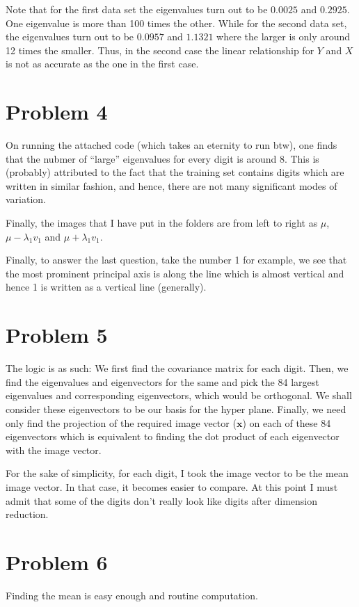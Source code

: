 \documentclass[12pt]{article}
\begin{document}
	Note that for the first data set the eigenvalues turn out to be $0.0025$ and $0.2925$. One eigenvalue is more than 100 times the other. While for the second data set, the eigenvalues turn out to be $0.0957$ and $1.1321$ where the larger is only around 12 times the smaller. Thus, in the second case the linear relationship for $Y$ and $X$ is not as accurate as the one in the first case.

	\newpage
	\section{Problem 4}
	On running the attached code (which takes an eternity to run btw), one finds that the nubmer of ``large'' eigenvalues for every digit is around 8. This is (probably) attributed to the fact that the training set contains digits which are written in similar fashion, and hence, there are not many significant modes of variation.

	Finally, the images that I have put in the folders are from left to right as $\mu$, $\mu - \lambda_1v_1$ and $\mu + \lambda_1v_1$.

	Finally, to answer the last question, take the number 1 for example, we see that the most prominent principal axis is along the line which is almost vertical and hence 1 is written as a vertical line (generally).
	
	\newpage
	\section{Problem 5}
	The logic is as such: We first find the covariance matrix for each digit. Then, we find the eigenvalues and eigenvectors for the same and pick the 84 largest eigenvalues and corresponding eigenvectors, which would be orthogonal. We shall consider these eigenvectors to be our basis for the hyper plane. Finally, we need only find the projection of the required image vector ($\mathbf{x}$) on each of these 84 eigenvectors which is equivalent to finding the dot product of each eigenvector with the image vector.

	For the sake of simplicity, for each digit, I took the image vector to be the mean image vector. In that case, it becomes easier to compare. At this point I must admit that some of the digits don't really look like digits after dimension reduction.

	\newpage
	\section{Problem 6}
	Finding the mean is easy enough and routine computation.
\end{document}
